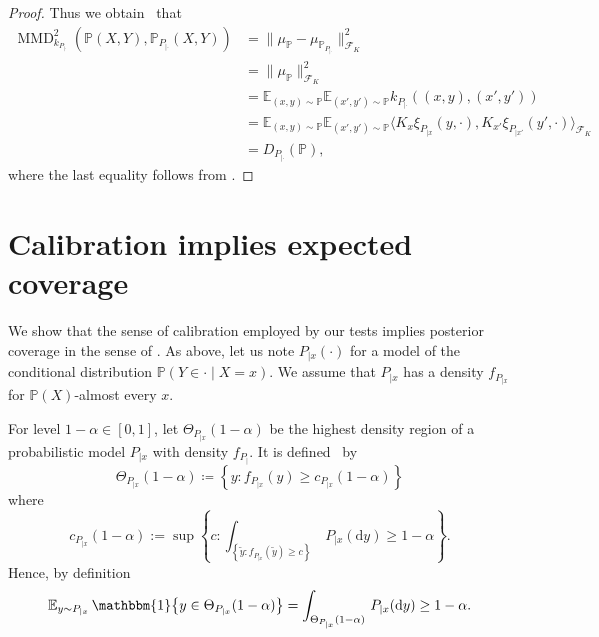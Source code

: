 \documentclass{uai2023} %
\begin{document}
\begin{proof}
Thus we obtain~\citep[][Lemma~4]{gretton2012kernel} that
\begin{equation*}
\begin{split}
\operatorname{MMD}^2_{k_{P_{|\cdot}}}(\mathbb{P}(X, Y), \mathbb{P}_{P_{|\cdot}}(X, Y)) &= \|\mu_{\mathbb{P}} - \mu_{\mathbb{P}_{P_{|\cdot}}}\|^2_{\mathcal{F}_K} \\
&= \|\mu_{\mathbb{P}}\|^2_{\mathcal{F}_K} \\
&= \mathbb{E}_{(x, y) \sim \mathbb{P}} \mathbb{E}_{(x', y') \sim \mathbb{P}} k_{P_{|\cdot}}((x, y), (x', y')) \\
&= \mathbb{E}_{(x, y) \sim \mathbb{P}} \mathbb{E}_{(x', y') \sim \mathbb{P}} \bigg\langle K_x \xi_{P_{|x}}(y, \cdot), K_{x'} \xi_{P_{|x'}}(y', \cdot) \bigg\rangle_{\mathcal{F}_K} \\
&= D_{P_{|\cdot}}(\mathbb{P}),
\end{split}
\end{equation*}
where the last equality follows from \cite[][Section~A.2]{jitkrittum2020testing}.
\end{proof}

\section{Calibration implies expected coverage}

We show that the sense of calibration employed by our tests implies posterior coverage in the sense of \citet{Hermans2021}.
As above, let us note $P_{|x}(\cdot)$ for a model of the conditional distribution $\mathbb{P}(Y \in \cdot \mid X = x)$.
We assume that $P_{|x}$ has a density $f_{P_{|x}}$ for $\mathbb{P}(X)$-almost every $x$.

For level $1 - \alpha \in [0, 1]$, let $\Theta_{P_{|x}}(1 - \alpha)$ be the highest density region of a probabilistic model $P_{|x}$ with density $f_{P_{|}}$.
It is defined~\citep[see, e.g.,][]{Hyndman1996} by
\begin{equation*}
    \Theta_{P_{|x}}(1 - \alpha) \coloneqq \left\{ y \colon f_{P_{|x}}(y) \geq c_{P_{|x}}(1 - \alpha) \right\}
\end{equation*}
where
\begin{equation*}
    c_{P_{|x}}(1 - \alpha) := \sup \left\{ c \colon \int_{\left\{\tilde{y} \colon f_{P_{|x}}(\tilde{y}) \geq c \right\}} \, P_{|x}(\mathrm{d}y) \geq 1 - \alpha \right\}.
\end{equation*}
Hence, by definition \citep[see, e.g.,][]{Hermans2021}
\begin{equation*}
    \E_{y \sim P_{|x}} \mathbbm{1}\big\{y \in \Theta_{P_{|x}}(1 - \alpha)\big\}
    =\int_{\Theta_{P_{|x}}(1 - \alpha)} \, P_{|x}(\mathrm{d}y) \geq 1 - \alpha.
\end{equation*}
\end{document}
